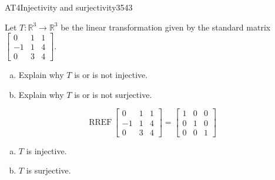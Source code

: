 \begin{exercise}{AT4}{Injectivity and surjectivity}{3543} 
\begin{exerciseStatement} 

 Let \(T:\mathbb{R}^3 \to \mathbb{R}^3\) be the linear transformation given by the standard matrix \(\left[\begin{array}{ccc}
0 & 1 & 1 \\
-1 & 1 & 4 \\
0 & 3 & 4
\end{array}\right]\). 

 

\begin{enumerate}[(a)]
\item 

Explain why \(T\) is or is not injective.


\item 

Explain why \(T\) is or is not surjective.


\end{enumerate}

     \end{exerciseStatement}
 \begin{exerciseAnswer} 

\[\mathrm{RREF}\,\left[\begin{array}{ccc}
0 & 1 & 1 \\
-1 & 1 & 4 \\
0 & 3 & 4
\end{array}\right]=\left[\begin{array}{ccc}
1 & 0 & 0 \\
0 & 1 & 0 \\
0 & 0 & 1
\end{array}\right]\]

 

\begin{enumerate}[(a)]
\item  

\(T\) is injective.

 
\item  

\(T\) is surjective.

 
\end{enumerate}

     \end{exerciseAnswer}
 \end{exercise}


